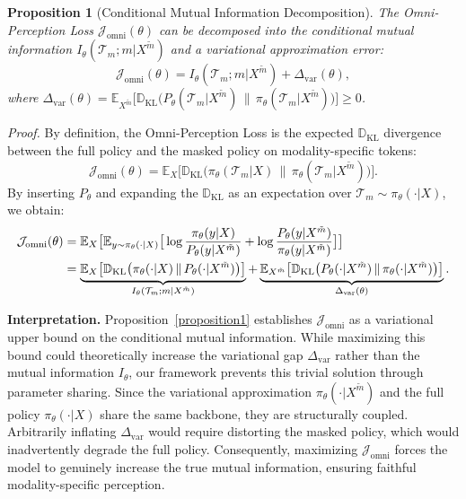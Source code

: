 \documentclass{article}
\theoremstyle{plain}
\newtheorem{proposition}[theorem]{Proposition}
\theoremstyle{definition}
\theoremstyle{remark}
\begin{document}
\begin{proposition}[Conditional Mutual Information Decomposition]
The Omni-Perception Loss $\mathcal{J}_{\mathrm{omni}}(\theta)$ can be decomposed into the conditional mutual information $I_\theta(\mathcal{T}_{m}; m | X^{\tilde{m}})$ and a variational approximation error:
\begin{equation}
\mathcal{J}_{\mathrm{omni}}(\theta) = I_\theta(\mathcal{T}_{m}; m | X^{\tilde{m}}) + \Delta_{\mathrm{var}}(\theta),
\end{equation}
where $\Delta_{\mathrm{var}}(\theta) = \mathbb{E}_{X^{\tilde{m}}} \big[ \mathbb{D}_{\mathrm{KL}}\big( P_\theta(\mathcal{T}_{m} | X^{\tilde{m}}) \,\|\, \pi_\theta(\mathcal{T}_{m} | X^{\tilde{m}}) \big) \big] \geq 0$.
\end{proposition}

\noindent \textit{Proof.}
By definition, the Omni-Perception Loss is the expected $\mathbb{D}_{\mathrm{KL}}$ divergence between the full policy and the masked policy on modality-specific tokens:
\begin{equation}
\mathcal{J}_{\mathrm{omni}}(\theta) = \mathbb{E}_{X} \big[ \mathbb{D}_{\mathrm{KL}}\big( \pi_\theta(\mathcal{T}_{m} | X) \,\|\, \pi_\theta(\mathcal{T}_{m} | X^{\tilde{m}}) \big) \big].
\end{equation}
By inserting $P_\theta$ and expanding the $\mathbb{D}_{\mathrm{KL}}$ as an expectation over $\mathcal{T}_{m} \sim \pi_\theta(\cdot|X)$, we obtain:
\begin{align}
\mathcal{J}_{\mathrm{omni}}(\theta)
&= \mathbb{E}_{X} \big[ \mathbb{E}_{y \sim \pi_\theta(\cdot|X)} \big[ \log \frac{\pi_\theta(y | X)}{P_\theta(y | X^{\tilde{m}})} + \log \frac{P_\theta(y | X^{\tilde{m}})}{\pi_\theta(y | X^{\tilde{m}})} \big] \big] \notag \\
&= \underbrace{\mathbb{E}_{X} \big[ \mathbb{D}_{\mathrm{KL}}\big( \pi_\theta(\cdot | X) \,\|\, P_\theta(\cdot | X^{\tilde{m}}) \big) \big]}_{I_\theta(\mathcal{T}_{m}; m | X^{\tilde{m}})} + \underbrace{\mathbb{E}_{X^{\tilde{m}}} \big[ \mathbb{D}_{\mathrm{KL}}\big( P_\theta(\cdot | X^{\tilde{m}}) \,\|\, \pi_\theta(\cdot | X^{\tilde{m}}) \big) \big]}_{\Delta_{\mathrm{var}}(\theta)}.
\end{align}

\noindent\textbf{Interpretation.} Proposition~\ref{proposition1} establishes $\mathcal{J}_{\mathrm{omni}}$ as a variational upper bound on the conditional mutual information. While maximizing this bound could theoretically increase the variational gap $\Delta_{\mathrm{var}}$ rather than the mutual information $I_\theta$, our framework prevents this trivial solution through parameter sharing. Since the variational approximation $\pi_\theta(\cdot | X^{\tilde{m}})$ and the full policy $\pi_\theta(\cdot | X)$ share the same backbone, they are structurally coupled. Arbitrarily inflating $\Delta_{\mathrm{var}}$ would require distorting the masked policy, which would inadvertently degrade the full policy. Consequently, maximizing $\mathcal{J}_{\mathrm{omni}}$ forces the model to genuinely increase the true mutual information, ensuring faithful modality-specific perception.
\end{document}
